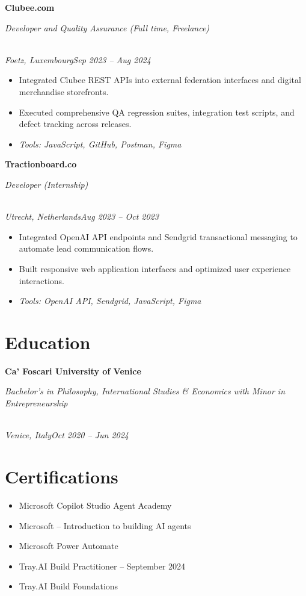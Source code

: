 \documentclass[a4paper,10pt]{article}
\newcommand{\role}[4]{\vspace{3pt}\noindent\hspace{0.6em}\parbox[t]{0.38\textwidth}{\raggedright\textbf{#1}}\hfill\parbox[t]{0.58\textwidth}{\raggedleft\textit{#2}}\\{\textit{#3}\hfill\textit{#4}}\vspace{1pt}}
\begin{document}
\role{Clubee.com}{Developer and Quality Assurance (Full time, Freelance)}{Foetz, Luxembourg}{Sep 2023 -- Aug 2024}
\begin{itemize}
\item Integrated Clubee REST APIs into external federation interfaces and digital merchandise storefronts.
\item Executed comprehensive QA regression suites, integration test scripts, and defect tracking across releases.
\item \textit{Tools: JavaScript, GitHub, Postman, Figma}
\end{itemize}

\role{Tractionboard.co}{Developer (Internship)}{Utrecht, Netherlands}{Aug 2023 -- Oct 2023}
\begin{itemize}
\item Integrated OpenAI API endpoints and Sendgrid transactional messaging to automate lead communication flows.
\item Built responsive web application interfaces and optimized user experience interactions.
\item \textit{Tools: OpenAI API, Sendgrid, JavaScript, Figma}
\end{itemize}

\section{Education}
\role{Ca' Foscari University of Venice}{Bachelor's in Philosophy, International Studies \& Economics with Minor in Entrepreneurship}{Venice, Italy}{Oct 2020 -- Jun 2024}

\section{Certifications}
\begin{itemize}
\item Microsoft Copilot Studio Agent Academy
\item Microsoft -- Introduction to building AI agents
\item Microsoft Power Automate
\item Tray.AI Build Practitioner -- September 2024
\item Tray.AI Build Foundations
\end{itemize}
\end{document}
